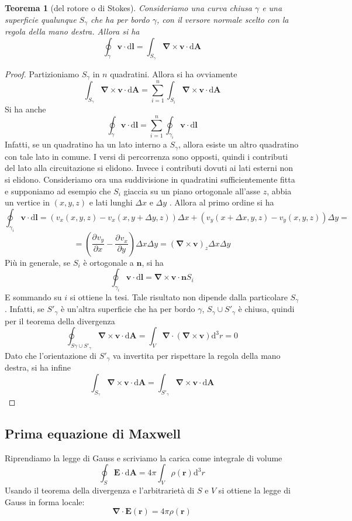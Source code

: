\documentclass[a4paper,11pt]{book}
\newcommand{\dif}{\mathrm{d}}
\newcommand{\der}[3][]{\frac{\partial ^{#1}#2}{\partial {#3}^{#1}}}
\let\oldnabla\nabla
\renewcommand{\nabla}{\vec{\oldnabla}}
\renewcommand{\vec}[1]{\mathbf{#1}}
\theoremstyle{theorem}
\newtheorem{teorema}{Teorema}[section]
\theoremstyle{definition}
\begin{document}
\begin{teorema}[del rotore o di Stokes]
	Consideriamo una curva chiusa $\gamma$ e una superficie qualunque $S_\gamma$ che ha per bordo $\gamma$, con il versore normale scelto con la regola della mano destra. Allora si ha
	\[\oint_\gamma\vec{v}\cdot\dif\vec{l}=\int_{S_\gamma}\nabla\times\vec{v}\cdot\dif\vec{A}\]
\end{teorema}
\begin{proof}
	Partizioniamo $S_\gamma$ in $n$ quadratini. Allora si ha ovviamente
	\[\int_{S_\gamma}\nabla\times\vec{v}\cdot\dif\vec{A}=\sum_{i=1}^{n}\int_{S_i}\nabla\times\vec{v}\cdot\dif\vec{A}\]
	Si ha anche
	\[\oint_\gamma\vec{v}\cdot\dif\vec{l}=\sum_{i=1}^{n}\oint_{\gamma_i}\vec{v}\cdot\dif\vec{l}\]
	Infatti, se un quadratino ha un lato interno a $S_\gamma$, allora esiste un altro quadratino con tale lato in comune. I versi di percorrenza sono opposti, quindi i contributi del lato alla circuitazione si elidono. Invece i contributi dovuti ai lati esterni non si elidono. Consideriamo ora una suddivisione in quadratini sufficientemente fitta e supponiamo ad esempio che $S_i$ giaccia su un piano ortogonale all'asse $z$, abbia un vertice in $(x,y,z)$ e lati lunghi $\Delta x$ e $\Delta y$ . Allora al primo ordine si ha
	\[\oint_{\gamma_i}\vec{v}\cdot\dif\vec{l}=\left(v_x(x,y,z)-v_x(x,y+\Delta y,z)\right)\Delta x+\left(v_y(x+\Delta x,y,z)-v_y(x,y,z)\right)\Delta y=\]\[=\left(\der{v_y}{x}-\der{v_x}{y}\right)\Delta x\Delta y=\left(\nabla\times\vec{v}\right)_z\Delta x\Delta y\]
	Più in generale, se $S_i$ è ortogonale a $\vec{n}$, si ha
	\[\oint_{\gamma_i}\vec{v}\cdot\dif\vec{l}=\nabla\times\vec{v}\cdot\vec{n}S_i\]
	E sommando su $i$ si ottiene la tesi. Tale risultato non dipende dalla particolare $S_\gamma$. Infatti, se $S'_\gamma$ è un'altra superficie che ha per bordo $\gamma$, $S_\gamma\cup S'_\gamma$ è chiusa, quindi per il teorema della divergenza
	\[\oint_{S\gamma\cup S'_\gamma}\nabla\times\vec{v}\cdot\dif\vec{A}=\int_V\nabla\cdot\left(\nabla\times\vec{v}\right)\dif^3r=0\]
	Dato che l'orientazione di $S'_\gamma$ va invertita per rispettare la regola della mano destra, si ha infine
	\[\int_{S_\gamma}\nabla\times\vec{v}\cdot\dif\vec{A}=\int_{S'_\gamma}\nabla\times\vec{v}\cdot\dif\vec{A}\]
\end{proof}
\subsection{Prima equazione di Maxwell}
Riprendiamo la legge di Gauss e scriviamo la carica come integrale di volume
\[
	\oint_S\vec{E}\cdot\dif\vec{A}=4\pi\int_V\rho(\vec{r})\dif^3r
\]
Usando il teorema della divergenza e l'arbitrarietà di $S$ e $V$ si ottiene la legge di Gauss in forma locale:
\[
	\nabla\cdot\vec{E}(\vec{r})=4\pi\rho(\vec{r})
\]
\end{document}
